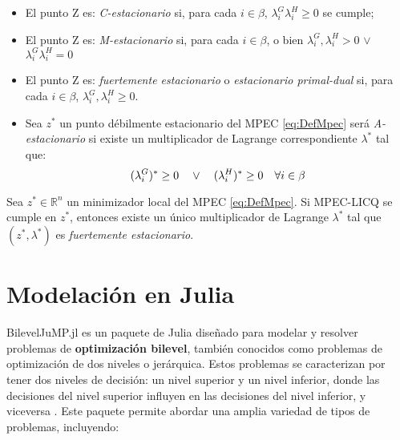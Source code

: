 \begin{itemize}
\item \begin{definition}
  El punto Z es: \textit{C-estacionario} si, para cada $i \in \beta$, $\lambda_i^G\lambda_i^H \geq 0$ se cumple;
\end{definition}
\item \begin{definition}
    El punto Z es: \textit{M-estacionario} si, para cada $i \in \beta$, o bien $\lambda_i^G,\lambda_i^H > 0$ $\vee$ $\lambda_i^G \lambda_i^H = 0$
\end{definition}
\item \begin{definition}
    El punto Z es: \textit{fuertemente estacionario} o \textit{estacionario primal-dual} si, para cada $i \in \beta$, $\lambda_i^G, \lambda_i^H \geq 0$.
\end{definition}
\item \begin{definition}
   Sea $z^*$ un punto débilmente estacionario del MPEC \eqref{eq:DefMpec} será \textit{A-estacionario} si existe un multiplicador de Lagrange correspondiente $\lambda^*$ tal que:
\begin{equation}
(\lambda_i^G)^* \geq 0 \quad \vee \quad (\lambda_i^H)^* \geq 0 \quad \forall i \in \beta \notag
\end{equation}
\end{definition}
\end{itemize}


\begin{theorem} 
Sea $z^* \in \mathbb{R}^n$ un minimizador local del MPEC \eqref{eq:DefMpec}. Si MPEC-LICQ se cumple en $z^*$, entonces existe un único multiplicador de Lagrange $\lambda^*$ tal que $(z^*, \lambda^*)$ es \textit{fuertemente estacionario}.
\end{theorem}

\section{Modelación en Julia}
BilevelJuMP.jl es un paquete de Julia diseñado para modelar y resolver problemas de \textbf{optimización bilevel}, también conocidos como problemas de optimización de dos niveles o jerárquica. Estos problemas se caracterizan por tener dos niveles de decisión: un nivel superior y un nivel inferior, donde las decisiones del nivel superior influyen en las decisiones del nivel inferior, y viceversa \cite{BilevelJump}.
Este paquete permite abordar una amplia variedad de tipos de problemas, incluyendo:

